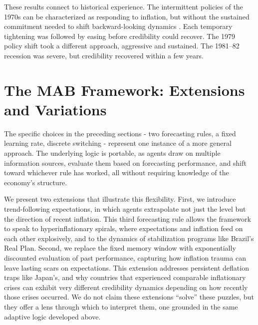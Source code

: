 \documentclass[10pt]{article}
\begin{document}
These results connect to historical experience. The intermittent policies of the 1970s can be characterized as responding to inflation, but without the sustained commitment needed to shift backward-looking dynamics \citep{goodfriend2005}. Each temporary tightening was followed by easing before credibility could recover. The 1979 policy shift took a different approach, aggressive and sustained. The 1981–82 recession was severe, but credibility recovered within a few years.


\section{The MAB Framework: Extensions and Variations}
\label{sec:extensions}

The specific choices in the preceding sections - two forecasting rules, a fixed learning rate, discrete switching - represent one instance of a more general approach. The underlying logic is portable, as agents draw on multiple information sources, evaluate them based on forecasting performance, and shift toward whichever rule has worked, all without requiring knowledge of the economy's structure.

We present two extensions that illustrate this flexibility. First, we introduce trend-following expectations, in which agents extrapolate not just the level but the direction of recent inflation. This third forecasting rule allows the framework to speak to hyperinflationary spirals, where expectations and inflation feed on each other explosively, and to the dynamics of stabilization programs like Brazil's Real Plan. Second, we replace the fixed memory window with exponentially discounted evaluation of past performance, capturing how inflation trauma can leave lasting scars on expectations. This extension addresses persistent deflation traps like Japan's, and why countries that experienced comparable inflationary crises can exhibit very different credibility dynamics depending on how recently those crises occurred. We do not claim these extensions ``solve'' these puzzles, but they offer a lens through which to interpret them, one grounded in the same adaptive logic developed above.
\end{document}
